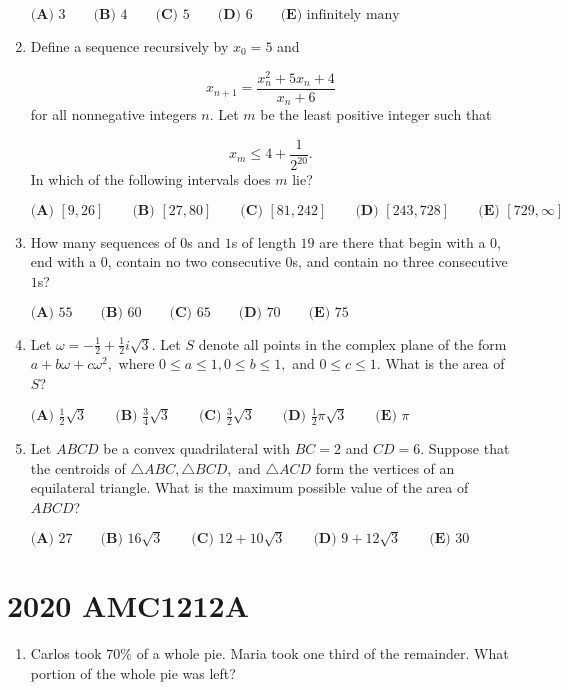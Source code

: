 \documentclass{article}
\begin{document}
\begin{enumerate}[label=\arabic*., itemsep=0.5em]
$\textbf{(A) } 3 \qquad\textbf{(B) } 4 \qquad\textbf{(C) } 5 \qquad\textbf{(D) } 6 \qquad\textbf{(E) } \text{infinitely many}$\par \vspace{0.5em}\item Define a sequence recursively by $x_0=5$ and

\begin{equation*}
x_{n+1}=\frac{x_n^2+5x_n+4}{x_n+6}
\end{equation*}
for all nonnegative integers $n.$ Let $m$ be the least positive integer such that

\begin{equation*}
x_m\leq 4+\frac{1}{2^{20}}.
\end{equation*}
In which of the following intervals does $m$ lie?

$\textbf{(A) } [9,26] \qquad\textbf{(B) } [27,80] \qquad\textbf{(C) } [81,242]\qquad\textbf{(D) } [243,728] \qquad\textbf{(E) } [729,\infty]$\par \vspace{0.5em}\item How many sequences of $0$s and $1$s of length $19$ are there that begin with a $0$, end with a $0$, contain no two consecutive $0$s, and contain no three consecutive $1$s?

$\textbf{(A) }55\qquad\textbf{(B) }60\qquad\textbf{(C) }65\qquad\textbf{(D) }70\qquad\textbf{(E) }75$\par \vspace{0.5em}\item Let $\omega=-\tfrac{1}{2}+\tfrac{1}{2}i\sqrt3.$ Let $S$ denote all points in the complex plane of the form $a+b\omega+c\omega^2,$ where $0\leq a \leq 1,0\leq b\leq 1,$ and $0\leq c\leq 1.$ What is the area of $S$?

$\textbf{(A) } \frac{1}{2}\sqrt3 \qquad\textbf{(B) } \frac{3}{4}\sqrt3 \qquad\textbf{(C) } \frac{3}{2}\sqrt3\qquad\textbf{(D) } \frac{1}{2}\pi\sqrt3 \qquad\textbf{(E) } \pi$\par \vspace{0.5em}\item Let $ABCD$ be a convex quadrilateral with $BC=2$ and $CD=6.$ Suppose that the centroids of $\triangle ABC,\triangle BCD,$ and $\triangle ACD$ form the vertices of an equilateral triangle. What is the maximum possible value of the area of $ABCD$?

$\textbf{(A) } 27 \qquad\textbf{(B) } 16\sqrt3 \qquad\textbf{(C) } 12+10\sqrt3 \qquad\textbf{(D) } 9+12\sqrt3 \qquad\textbf{(E) } 30$\par \vspace{0.5em}\end{enumerate}\newpage\section*{2020 AMC1212A}\begin{enumerate}[label=\arabic*., itemsep=0.5em]\item Carlos took $70\%$ of a whole pie. Maria took one third of the remainder. What portion of the whole pie was left?


\end{enumerate}
\end{document}
